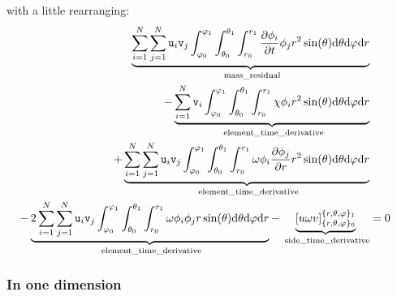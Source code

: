 with a little rearranging:
\begin{equation}
\begin{split}
  \underbrace{\sum_{i=1}^N\sum_{j=1}^N\ui_i\vi_j\intr\doverd{\phi_i}{t}\phi_j \dVs}_\text{ mass\_residual}                    \\
- \underbrace{\sum_{i=1}^N\vi_i\intr\chi\phi_i \dVs}_\text{ element\_time\_derivative}                                        \\
+ \underbrace{\sum_{i=1}^N\sum_{j=1}^N\ui_i\vi_j\intr\omega\phi_i\doverd{\phi_j}{r} \dVs}_\text{ element\_time\_derivative}   \\
- \underbrace{2\sum_{i=1}^N\sum_{j=1}^N\ui_i\vi_j\intr\omega\phi_i\phi_jr\sin(\theta)\dd\theta\dd\varphi\dd r}_\text{ element\_time\_derivative}
- \underbrace{\left[u\omega v\right]^{\{r,\theta,\varphi\}_1}_{\{r,\theta,\varphi\}_0}}_\text{ side\_time\_derivative}
& = 0
\end{split}
\end{equation}

\subsubsection{In one dimension}

